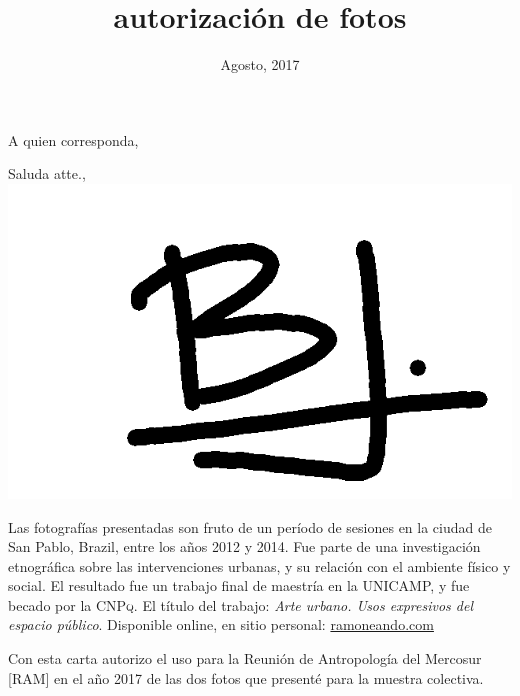 \documentclass[11pt,a4paper,sans]{moderncv}        %
\title{autorización de fotos}                               %
\begin{document}
\date{Agosto, 2017} \opening{A quien corresponda,}
\closing{Saluda atte.,  %
\includegraphics[width=0.1 \textwidth]{./signature.png} } 
\makelettertitle

Las fotografías presentadas son fruto de un período de sesiones en la ciudad de San Pablo, Brazil, entre los años 2012 y 2014. Fue parte de una investigación etnográfica sobre las intervenciones urbanas, y su relación con el ambiente físico y social. El resultado fue un trabajo final de maestría en la UNICAMP, y fue becado por la \textsc{CNPq}. El título del trabajo: \textit{Arte urbano. Usos expresivos del espacio público}. Disponible online, en sitio personal: \href{http://ramoneando.com/docs/Juarez,Benjamin_M.pdf}{ramoneando.com}

Con esta carta autorizo el uso para la Reunión de Antropología del Mercosur [RAM] en el año 2017 de las dos fotos que presenté para la muestra colectiva.


\makeletterclosing



\end{document}
